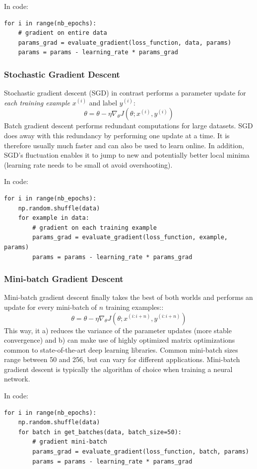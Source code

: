\documentclass[11pt]{article}
\begin{document}
In  code:
\begin{lstlisting}
for i in range(nb_epochs):
	# gradient on entire data
	params_grad = evaluate_gradient(loss_function, data, params)
	params = params - learning_rate * params_grad
\end{lstlisting}
%

\subsubsection*{Stochastic Gradient Descent}
Stochastic gradient descent (SGD) in contrast performs a parameter update for \textit{each training example} $x^{(i)}$ and label $y^{(i)}$:
\[ \theta = \theta - \eta \nabla_{\theta} J(\theta; x^{(i)}, y^{(i)})
\]
Batch gradient descent performs redundant computations for large datasets. SGD does away with this redundancy by performing one update at a time. It is therefore usually much faster and can also be used to learn online. In addition, SGD's fluctuation enables it to jump to new and potentially better local minima (learning rate needs to be small ot avoid overshooting).

In  code:
\begin{lstlisting}
for i in range(nb_epochs):
	np.random.shuffle(data)	
	for example in data:
		# gradient on each training example
		params_grad = evaluate_gradient(loss_function, example, params)
		params = params - learning_rate * params_grad
\end{lstlisting}
%

\subsubsection*{Mini-batch Gradient Descent}
Mini-batch gradient descent finally takes the best of both worlds and performs an update for every mini-batch of $n$ training examples::
\[ \theta = \theta - \eta \nabla_{\theta} J(\theta; x^{(i:i+n)}, y^{(i:i+n)})
\]
This way, it a) reduces the variance of the parameter updates (more stable convergence) and b) can make use of highly optimized matrix optimizations common to state-of-the-art deep learning libraries. Common mini-batch sizes range between 50 and 256, but can vary for different applications. Mini-batch gradient descent is typically the algorithm of choice when training a neural network.

In  code:
\begin{lstlisting}
for i in range(nb_epochs):
	np.random.shuffle(data)
	for batch in get_batches(data, batch_size=50):
		# gradient mini-batch
		params_grad = evaluate_gradient(loss_function, batch, params)
		params = params - learning_rate * params_grad
\end{lstlisting}
\end{document}
